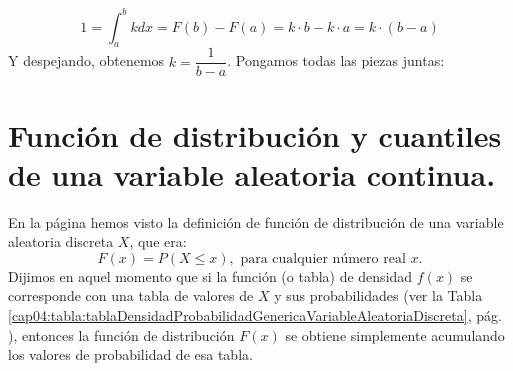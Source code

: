 \[
1=\int_a^b k dx=F(b)-F(a)=k\cdot b-k\cdot a=k\cdot(b-a)
\]
Y despejando, obtenemos $k=\dfrac{1}{b-a}$. Pongamos todas las piezas juntas:
    \begin{center}
    \end{center}


\section{Función de distribución y cuantiles de una variable aleatoria continua.}
\label{cap05:sec:FuncionDistribucionVariableContinua}

En la página \pageref{cap04:ecu:FuncionDistribucionVariableDiscreta} hemos visto la definición de función de distribución de una  variable aleatoria discreta $X$, que era:
\[F(x)=P(X\leq x),\mbox{ para cualquier número real }x.\]
Dijimos en aquel momento que si la función (o tabla) de densidad $f(x)$ se corresponde con una tabla de valores de $X$ y sus probabilidades (ver la Tabla \ref{cap04:tabla:tablaDensidadProbabilidadGenericaVariableAleatoriaDiscreta}, pág.
\pageref{cap04:tabla:tablaDensidadProbabilidadGenericaVariableAleatoriaDiscreta}), entonces la función de distribución $F(x)$ se obtiene simplemente acumulando los valores de probabilidad de esa tabla.

